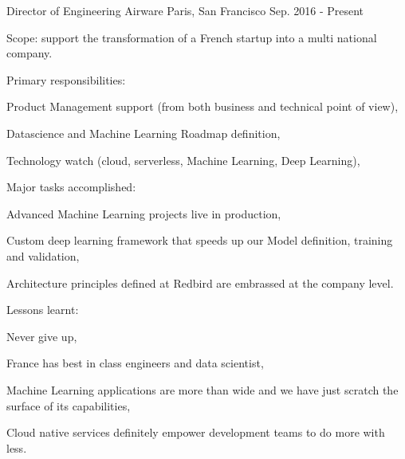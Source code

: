 

\begin{cventries}

  \cventry
    {Director of Engineering} %
    {Airware} %
    {Paris, San Francisco} %
    {Sep. 2016 - Present} %
    {
      \begin{cvitems} %
        \item {Scope: support the transformation of a French startup into a multi national company.}
        \item {Primary responsibilities:}
        \begin{cvsubitems}
          \item {Product Management support (from both business and technical point of view),}
          \item {Datascience and Machine Learning Roadmap definition,}
          \item {Technology watch (cloud, serverless, Machine Learning, Deep Learning),}
        \end{cvsubitems}
        \item {Major tasks accomplished:}
        \begin{cvsubitems}
          \item {Advanced Machine Learning projects live in production,}
          \item {Custom deep learning framework that speeds up our Model definition, training and validation,}
          \item {Architecture principles defined at Redbird are embrassed at the company level.}
        \end{cvsubitems}
        \item {Lessons learnt:}
        \begin{cvsubitems}
          \item {Never give up,}
          \item {France has best in class engineers and data scientist,}
          \item {Machine Learning applications are more than wide and we have just scratch the surface of its capabilities,}
          \item {Cloud native services definitely empower development teams to do more with less.}
        \end{cvsubitems}
      \end{cvitems}
    }


\end{cventries}
